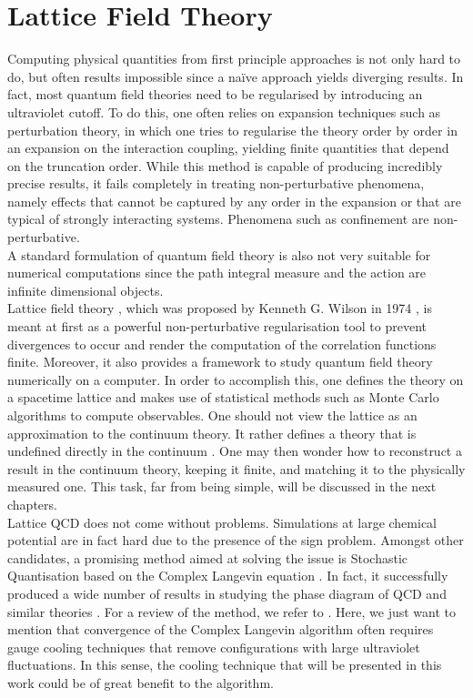 \section{Lattice Field Theory}
Computing physical quantities from first principle approaches is not only hard to do, but often results impossible since a na\"ive approach yields diverging results. In fact, most quantum field theories need to be regularised by introducing an ultraviolet cutoff. To do this, one often relies on expansion techniques such as perturbation theory, in which one tries to regularise the theory order by order in an expansion on the interaction coupling, yielding finite quantities that depend on the truncation order.  While this method is capable of producing incredibly precise results, it fails completely in treating non-perturbative phenomena, namely effects that cannot be captured by any order in the expansion or that are typical of strongly interacting systems.
Phenomena such as confinement are non-perturbative.\\
A standard formulation of quantum field theory is also not very suitable for numerical computations since the path integral measure and the action are infinite dimensional objects. \\
Lattice field theory \cite{Montvay1994QuantumLattice,rothe_LGT,gattringer_LQCD,creutz_2023}, which was proposed by Kenneth G. Wilson in 1974 \cite{wilson_lqcd}, is meant at first as a powerful non-perturbative regularisation tool to prevent divergences to occur and render the computation of the correlation functions finite. Moreover, it also provides a framework to study quantum field theory numerically on a computer. In order to accomplish this, one defines the theory on a spacetime lattice and makes use of statistical methods such as Monte Carlo algorithms to compute observables. 
One should not view the lattice as an approximation to the continuum theory. It rather defines a theory that is undefined directly in the continuum \cite{Wiese:2009qsa}. One may then wonder how to reconstruct a result in the continuum theory, keeping it finite, and matching it to the physically measured one. This task, far from being simple, will be  discussed in the next chapters.\\
Lattice QCD does not come without problems. Simulations at large chemical potential are in fact hard due to the presence of the sign problem. Amongst other candidates, a promising method aimed at solving the issue is Stochastic Quantisation based on the Complex Langevin equation \cite{Gert_Aarts_2008,Berger_2021,Seiler_2018_status,Aarts_2010}. In fact, it successfully produced a wide number of results in studying the phase diagram of QCD and similar theories \cite{attanasio,Attanasio_2020,langelage2013onset,sinclair2016complex,Sexty_2014}. For a review of the method, we refer to \cite{Aarts_2016,Aarts_2013}. Here, we just want to mention that convergence of the Complex Langevin algorithm often requires gauge cooling techniques \cite{gaugecool} that remove configurations with large ultraviolet fluctuations. 
In this sense, the cooling technique that will be presented in this work could be of great benefit to the algorithm.

